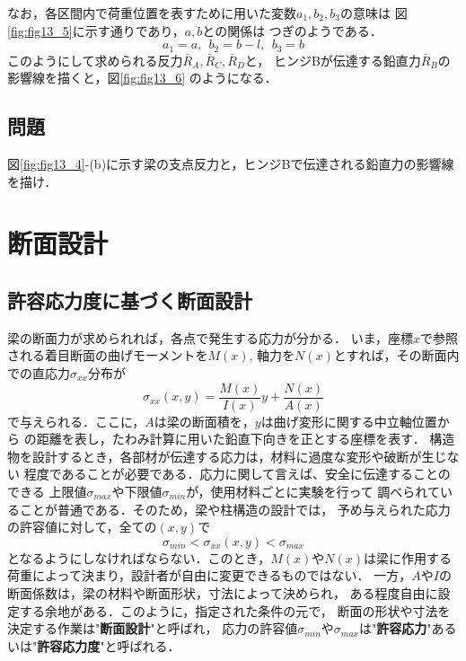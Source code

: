 \documentclass[10pt,a4j]{jarticle}
\begin{document}
なお，各区間内で荷重位置を表すために用いた変数$a_1,b_2, b_3$の意味は
図\ref{fig:fig13_5}に示す通りであり，$a,b$との関係は
つぎのようである．
\begin{equation}
	a_1=a, \ \ b_2=b-l, \ \ b_3=b
\end{equation}
このようにして求められる反力$\bar R_A, \bar R_C,\bar R_D$と，
ヒンジBが伝達する鉛直力$\bar{R}_B$の影響線を描くと，図\ref{fig:fig13_6}
のようになる．
\subsection{問題}
図\ref{fig:fig13_4}-(b)に示す梁の支点反力と，ヒンジBで伝達される鉛直力の影響線を描け．
\section{断面設計}
\subsection{許容応力度に基づく断面設計}
梁の断面力が求められれば，各点で発生する応力が分かる．
いま，座標$x$で参照される着目断面の曲げモーメントを$M(x)$, 
軸力を$N(x)$とすれば，その断面内での直応力$\sigma_{xx}$分布が
\begin{equation}
	\sigma_{xx}(x,y)=\frac{M(x)}{I(x)}y+\frac{N(x)}{A(x)}
\end{equation}
で与えられる．ここに，$A$は梁の断面積を，$y$は曲げ変形に関する中立軸位置から
の距離を表し，たわみ計算に用いた鉛直下向きを正とする座標を表す．
構造物を設計するとき，各部材が伝達する応力は，材料に過度な変形や破断が生じない
程度であることが必要である．応力に関して言えば、安全に伝達することのできる
上限値$\sigma_{max}$や下限値$\sigma_{min}$が，使用材料ごとに実験を行って
調べられていることが普通である．そのため，梁や柱構造の設計では，
予め与えられた応力の許容値に対して，全ての$(x,y)$で
\begin{equation}
	\sigma_{min}< \sigma_{xx}(x,y) < \sigma_{max}
	\label{eqn:sxx_siga}
\end{equation}
となるようにしなければならない．このとき，$M(x)$や$N(x)$は梁に作用する
荷重によって決まり，設計者が自由に変更できるものではない．
一方，$A$や$I$の断面係数は，梁の材料や断面形状，寸法によって決められ，
ある程度自由に設定する余地がある．このように，指定された条件の元で，
断面の形状や寸法を決定する作業は"{\bf 断面設計}"と呼ばれ，
応力の許容値$\sigma_{min}$や$\sigma_{max}$は"{\bf 許容応力}"あるいは"{\bf 許容応力度}"と呼ばれる．
\end{document}
